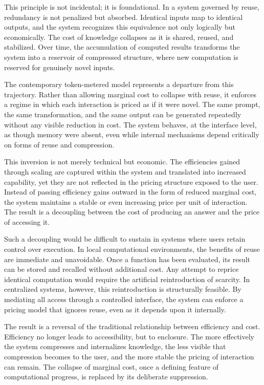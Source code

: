 \documentclass[12pt, oneside]{article}
\begin{document}
This principle is not incidental; it is foundational. In a system governed by reuse, redundancy is not penalized but absorbed. Identical inputs map to identical outputs, and the system recognizes this equivalence not only logically but economically. The cost of knowledge collapses as it is shared, reused, and stabilized. Over time, the accumulation of computed results transforms the system into a reservoir of compressed structure, where new computation is reserved for genuinely novel inputs.

The contemporary token-metered model represents a departure from this trajectory. Rather than allowing marginal cost to collapse with reuse, it enforces a regime in which each interaction is priced as if it were novel. The same prompt, the same transformation, and the same output can be generated repeatedly without any visible reduction in cost. The system behaves, at the interface level, as though memory were absent, even while internal mechanisms depend critically on forms of reuse and compression.

This inversion is not merely technical but economic. The efficiencies gained through scaling are captured within the system and translated into increased capability, yet they are not reflected in the pricing structure exposed to the user. Instead of passing efficiency gains outward in the form of reduced marginal cost, the system maintains a stable or even increasing price per unit of interaction. The result is a decoupling between the cost of producing an answer and the price of accessing it.

Such a decoupling would be difficult to sustain in systems where users retain control over execution. In local computational environments, the benefits of reuse are immediate and unavoidable. Once a function has been evaluated, its result can be stored and recalled without additional cost. Any attempt to reprice identical computation would require the artificial reintroduction of scarcity. In centralized systems, however, this reintroduction is structurally feasible. By mediating all access through a controlled interface, the system can enforce a pricing model that ignores reuse, even as it depends upon it internally.

The result is a reversal of the traditional relationship between efficiency and cost. Efficiency no longer leads to accessibility, but to enclosure. The more effectively the system compresses and internalizes knowledge, the less visible that compression becomes to the user, and the more stable the pricing of interaction can remain. The collapse of marginal cost, once a defining feature of computational progress, is replaced by its deliberate suppression.
\end{document}
